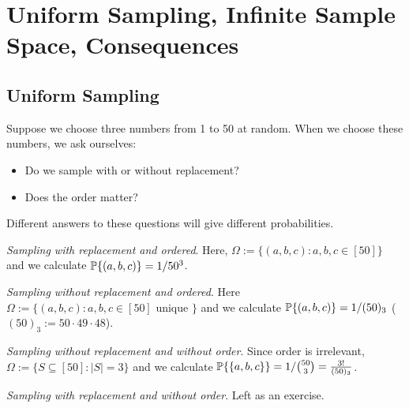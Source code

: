\section{Uniform Sampling, Infinite Sample Space, Consequences}

\subsection{Uniform Sampling}

\begin{example}
   Suppose we choose three numbers from 1 to 50 at random. When we choose these numbers, we ask ourselves:
   \begin{itemize}
      \item Do we sample with or without replacement?
      \item Does the order matter?
   \end{itemize}
   Different answers to these questions will give different probabilities.

   \textit{Sampling with replacement and ordered}. Here, $\Omega := \{(a,b,c) \colon a, b, c \in [50]\}$ and we calculate $\mathbb{P}\{(a,b,c)\} = 1/50^3$. 

   \textit{Sampling without replacement and ordered}. Here $\Omega := \{(a,b,c) \colon a, b, c \in [50] \text{ unique }\}$ and we calculate $\mathbb{P}\{(a,b,c)\} = 1/(50)_3$ ($(50)_3 := 50 \cdot 49 \cdot 48$).

   \textit{Sampling without replacement and without order}. Since order is irrelevant, $\Omega := \{S \subseteq [50] \colon |S| = 3\}$ and we calculate $\mathbb{P}\{\{a,b,c\}\} = 1/\binom{50}{3} = \frac{3!}{(50)_3}$.

   \textit{Sampling with replacement and without order}. Left as an exercise.
\end{example}

